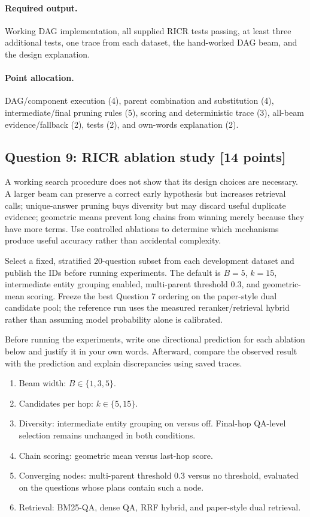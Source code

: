 \documentclass[11pt]{article}
\newcommand{\RICR}{{\mdseries\textsc{RICR}}\xspace}
\newcommand{\question}[3]{%
  \subsection[Question #1: #2 (#3 points)]{Question #1: #2 \hfill [#3 points]}%
}
\newcommand{\deliverables}{\paragraph{Required output.}}
\newcommand{\grading}{\paragraph{Point allocation.}}
\begin{document}
\deliverables Working DAG implementation, all supplied \RICR tests passing,
at least three additional tests, one trace from each dataset, the hand-worked
DAG beam, and the design explanation.

\grading DAG/component execution (4), parent combination and substitution
(4), intermediate/final pruning rules (5), scoring and deterministic trace
(3), all-beam evidence/fallback (2), tests (2), and own-words explanation (2).

\question{9}{\RICR ablation study}{14}

A working search procedure does not show that its design choices are
necessary. A larger beam can preserve a correct early hypothesis but increases
retrieval calls; unique-answer pruning buys diversity but may discard useful
duplicate evidence; geometric means prevent long chains from winning merely
because they have more terms. Use controlled ablations to determine which
mechanisms produce useful accuracy rather than accidental complexity.

Select a fixed, stratified 20-question subset from each development dataset
and publish the IDs before running experiments. The default is $B=5$, $k=15$,
intermediate entity grouping enabled, multi-parent threshold $0.3$, and
geometric-mean scoring. Freeze the best Question 7 ordering on the paper-style
dual candidate pool; the reference run uses the measured reranker/retrieval
hybrid rather than assuming model probability alone is calibrated.

Before running the experiments, write one directional prediction for each
ablation below and justify it in your own words. Afterward, compare the
observed result with the prediction and explain discrepancies using saved
traces.

\begin{enumerate}[label=(\alph*)]
  \item Beam width: $B\in\{1,3,5\}$.
  \item Candidates per hop: $k\in\{5,15\}$.
  \item Diversity: intermediate entity grouping on versus off. Final-hop
        QA-level selection remains unchanged in both conditions.
  \item Chain scoring: geometric mean versus last-hop score.
  \item Converging nodes: multi-parent threshold $0.3$ versus no threshold,
        evaluated on the questions whose plans contain such a node.
  \item Retrieval: BM25-QA, dense QA, RRF hybrid, and paper-style dual
        retrieval.
\end{enumerate}
\end{document}
